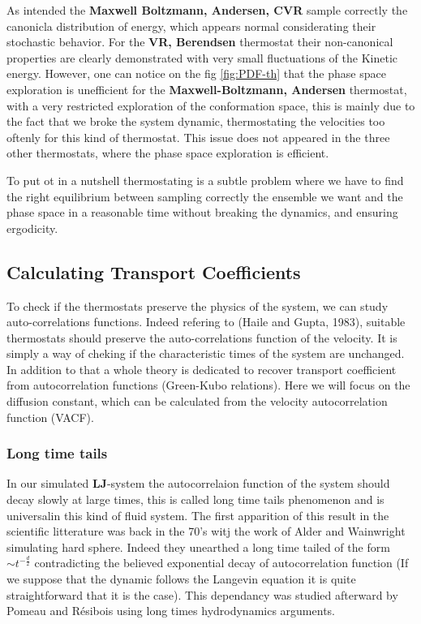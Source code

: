 \documentclass[ansiapaper]{report}
\begin{document}
\begin{multicols}{3}
\begin{figure}[H]
\end{figure}
 As intended the \textbf{Maxwell Boltzmann, Andersen, CVR} sample correctly the canonicla distribution of energy, which appears normal considerating their stochastic behavior. For the \textbf{VR, Berendsen} thermostat their non-canonical properties are clearly demonstrated with very small fluctuations of the Kinetic energy. However, one can notice on the fig \ref{fig:PDF-th} that the phase space exploration is unefficient for the \textbf{Maxwell-Boltzmann, Andersen} thermostat, with a very restricted exploration of the conformation space, this is mainly due to the fact that we broke the system dynamic, thermostating the velocities too oftenly for this kind of thermostat. This issue does not appeared in the three other thermostats, where the phase space exploration is efficient.

 To put ot in a nutshell thermostating is a subtle problem where we have to find the right equilibrium between sampling correctly the ensemble we want and the phase space in a reasonable time without breaking the dynamics, and ensuring ergodicity.

\subsection{Calculating Transport Coefficients}
To check if the thermostats preserve the physics of the system, we can study auto-correlations functions. Indeed refering to (Haile and Gupta, 1983), suitable thermostats should preserve the auto-correlations function of the velocity. It is simply a way of cheking if the characteristic times of the system are unchanged. In addition to that a whole theory is dedicated to recover transport coefficient from autocorrelation functions (Green-Kubo relations). Here we will focus on the diffusion constant, which can be calculated from the velocity autocorrelation function (VACF).

\subsubsection{Long time tails}
In our simulated \textbf{LJ}-system the autocorrelaion function of the system should decay slowly at large times, this is called long time tails phenomenon and is universalin this kind of fluid system. The first apparition of this result in the scientific litterature was back in the 70's witj the work of Alder and Wainwright simulating hard sphere. Indeed they unearthed a long time tailed of the form $\sim t^{-\frac{d}{2}}$ contradicting the believed exponential decay of autocorrelation function (If we suppose that the dynamic follows the Langevin equation it is quite straightforward that it is the case). This dependancy was studied afterward by Pomeau and Résibois using long times hydrodynamics arguments. 


\end{multicols}
\end{document}
